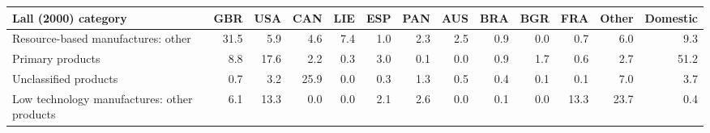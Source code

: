 \begin{tabular}{lrrrrrrrrrrrr}
\toprule
Lall (2000) category & GBR & USA & CAN & LIE & ESP & PAN & AUS & BRA & BGR & FRA & Other & Domestic \\
\midrule
Resource-based manufactures: other & 31.5 & 5.9 & 4.6 & 7.4 & 1.0 & 2.3 & 2.5 & 0.9 & 0.0 & 0.7 & 6.0 & 9.3 \\
Primary products & 8.8 & 17.6 & 2.2 & 0.3 & 3.0 & 0.1 & 0.0 & 0.9 & 1.7 & 0.6 & 2.7 & 51.2 \\
Unclassified products & 0.7 & 3.2 & 25.9 & 0.0 & 0.3 & 1.3 & 0.5 & 0.4 & 0.1 & 0.1 & 7.0 & 3.7 \\
Low technology manufactures: other products & 6.1 & 13.3 & 0.0 & 0.0 & 2.1 & 2.6 & 0.0 & 0.1 & 0.0 & 13.3 & 23.7 & 0.4 \\
\bottomrule
\end{tabular}
